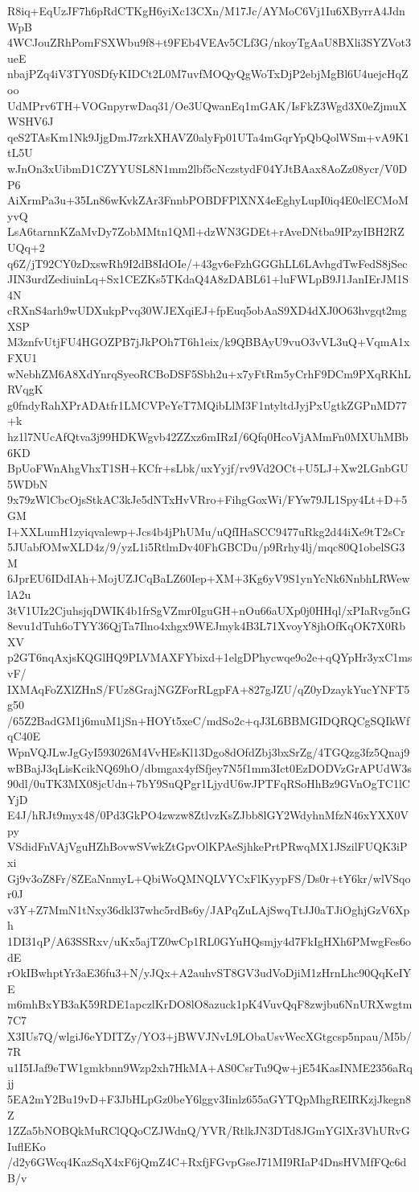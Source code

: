 R8iq+EqUzJF7h6pRdCTKgH6yiXc13CXn/M17Jc/AYMoC6Vj1Iu6XByrrA4JdnWpB
4WCJouZRhPomFSXWbu9f8+t9FEb4VEAv5CLf3G/nkoyTgAaU8BXli3SYZVot3ueE
nbajPZq4iV3TY0SDfyKIDCt2L0M7uvfMOQyQgWoTxDjP2ebjMgBl6U4uejcHqZoo
UdMPrv6TH+VOGnpyrwDaq31/Oe3UQwanEq1mGAK/IsFkZ3Wgd3X0eZjmuXWSHV6J
qeS2TAsKm1Nk9JjgDmJ7zrkXHAVZ0alyFp01UTa4mGqrYpQbQolWSm+vA9K1tL5U
wJnOn3xUibmD1CZYYUSL8N1mm2lbf5cNczstydF04YJtBAax8AoZz08ycr/V0DP6
AiXrmPa3u+35Ln86wKvkZAr3FnnbPOBDFPlXNX4eEghyLupI0iq4E0clECMoMyvQ
LsA6tarnnKZaMvDy7ZobMMtn1QMl+dzWN3GDEt+rAveDNtba9IPzyIBH2RZUQq+2
q6Z/jT92CY0zDxswRh9I2dB8IdOIe/+43gv6eFzhGGGhLL6LAvhgdTwFedS8jSec
JIN3urdZediuinLq+Sx1CEZKs5TKdaQ4A8zDABL61+luFWLpB9J1JanIErJM1S4N
cRXnS4arh9wUDXukpPvq30WJEXqiEJ+fpEuq5obAaS9XD4dXJ0O63hvgqt2mgXSP
M3znfvUtjFU4HGOZPB7jJkPOh7T6h1eix/k9QBBAyU9vuO3vVL3uQ+VqmA1xFXU1
wNebhZM6A8XdYnrqSyeoRCBoDSF5Sbh2u+x7yFtRm5yCrhF9DCm9PXqRKhLRVqgK
g0fndyRahXPrADAtfr1LMCVPeYeT7MQibLlM3F1ntyltdJyjPxUgtkZGPnMD77+k
hz1l7NUcAfQtva3j99HDKWgvb42ZZxz6mIRzI/6Qfq0HcoVjAMmFn0MXUhMBb6KD
BpUoFWnAhgVhxT1SH+KCfr+sLbk/uxYyjf/rv9Vd2OCt+U5LJ+Xw2LGnbGU5WDbN
9x79zWlCbcOjsStkAC3kJe5dNTxHvVRro+FihgGoxWi/FYw79JL1Spy4Lt+D+5GM
I+XXLumH1zyiqvalewp+Jcs4b4jPhUMu/uQfIHaSCC9477uRkg2d44iXe9tT2sCr
5JUabfOMwXLD4z/9/yzL1i5RtlmDv40FhGBCDu/p9Rrhy4lj/mqc80Q1obelSG3M
6JprEU6IDdIAh+MojUZJCqBaLZ60Iep+XM+3Kg6yV9S1ynYcNk6NnbhLRWewlA2u
3tV1UIz2CjuhsjqDWIK4b1frSgVZmr0IguGH+nOu66aUXp0j0HHql/xPIaRvg5nG
8evu1dTuh6oTYY36QjTa7Ilno4xhgx9WEJmyk4B3L71XvoyY8jhOfKqOK7X0RbXV
p2GT6nqAxjsKQGlHQ9PLVMAXFYbixd+1elgDPhycwqe9o2e+qQYpHr3yxC1msvF/
IXMAqFoZXlZHnS/FUz8GrajNGZForRLgpFA+827gJZU/qZ0yDzaykYucYNFT5g50
/65Z2BadGM1j6muM1jSn+HOYt5xeC/mdSo2c+qJ3L6BBMGIDQRQCgSQIkWfqC40E
WpnVQJLwJgGyI593026M4VvHEsKl13Dgo8dOfdZbj3bxSrZg/4TGQzg3fz5Qnaj9
wBBajJ3qLisKcikNQ69hO/dbmgax4yfSfjey7N5f1mm3Ict0EzDODVzGrAPUdW3s
90dl/0uTK3MX08jcUdn+7bY9SuQPgr1LjydU6wJPTFqRSoHhBz9GVnOgTC1lCYjD
E4J/hRJt9myx48/0Pd3GkPO4zwzw8ZtlvzKsZJbb8lGY2WdyhnMfzN46xYXX0Vpy
VSdidFnVAjVguHZhBovwSVwkZtGpvOlKPAeSjhkePrtPRwqMX1JSzilFUQK3iPxi
Gj9v3oZ8Fr/8ZEaNnmyL+QbiWoQMNQLVYCxFlKyypFS/Ds0r+tY6kr/wlVSqor0J
v3Y+Z7MmN1tNxy36dkl37whc5rdBs6y/JAPqZuLAjSwqTtJJ0aTJiOghjGzV6Xph
1DI31qP/A63SSRxv/uKx5ajTZ0wCp1RL0GYuHQsmjy4d7FkIgHXh6PMwgFes6odE
rOkIBwhptYr3aE36fu3+N/yJQx+A2auhvST8GV3udVoDjiM1zHrnLhc90QqKeIYE
m6mhBxYB3aK59RDE1apczlKrDO8lO8azuck1pK4VuvQqF8zwjbu6NnURXwgtm7C7
X3IUs7Q/wlgiJ6eYDITZy/YO3+jBWVJNvL9LObaUsvWecXGtgcsp5npau/M5b/7R
u1I5IJaf9eTW1gmkbnn9Wzp2xh7HkMA+AS0CsrTu9Qw+jE54KasINME2356aRqjj
5EA2mY2Bu19vD+F3JbHLpGz0beY6lggv3Iinlz655aGYTQpMhgREIRKzjJkegn8Z
1ZZa5bNOBQkMuRClQQoCZJWdnQ/YVR/RtlkJN3DTd8JGmYGlXr3VhURvGIuflEKo
/d2y6GWcq4KazSqX4xF6jQmZ4C+RxfjFGvpGseJ71MI9RIaP4DnsHVMfFQc6dB/v
